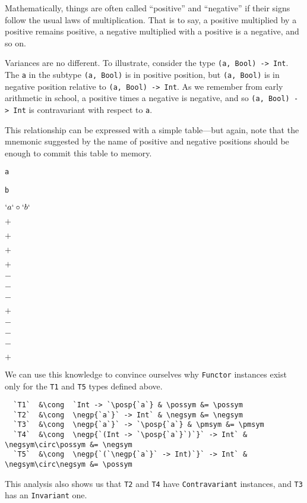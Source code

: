 \documentclass[
  11pt,
]{book}
\theoremstyle{nonumberplain}
\begin{document}
Mathematically, things are often called ``positive'' and ``negative'' if
their signs follow the usual laws of multiplication. That is to say, a
positive multiplied by a positive remains positive, a negative
multiplied with a positive is a negative, and so on.

Variances are no different. To illustrate, consider the type
\texttt{(a,\ Bool)\ -\textgreater{}\ Int}. The \texttt{a} in the subtype
\texttt{(a,\ Bool)} is in positive position, but \texttt{(a,\ Bool)} is
in negative position relative to
\texttt{(a,\ Bool)\ -\textgreater{}\ Int}. As we remember from early
arithmetic in school, a positive times a negative is negative, and so
\texttt{(a,\ Bool)\ -\textgreater{}\ Int} is contravariant with respect
to \texttt{a}.

This relationship can be expressed with a simple table---but again, note
that the mnemonic suggested by the name of positive and negative
positions should be enough to commit this table to memory.

\texttt{a}

\texttt{b}

\(`a` \circ `b`\)

\(+\)

\(+\)

\(+\)

\(+\)

\(-\)

\(-\)

\(-\)

\(+\)

\(-\)

\(-\)

\(-\)

\(+\)

We can use this knowledge to convince ourselves why \texttt{Functor}
instances exist only for the \texttt{T1} and \texttt{T5} types defined
above.

\begin{verbatim}
  `T1`  &\cong  `Int -> `\posp{`a`} & \possym &= \possym
  `T2`  &\cong  \negp{`a`}` -> Int` & \negsym &= \negsym
  `T3`  &\cong  \negp{`a`}` -> `\posp{`a`} & \pmsym &= \pmsym
  `T4`  &\cong  \negp{`(Int -> `\posp{`a`}`)`}` -> Int` & \negsym\circ\possym &= \negsym
  `T5`  &\cong  \negp{`(`\negp{`a`}` -> Int)`}` -> Int` & \negsym\circ\negsym &= \possym
\end{verbatim}

This analysis also shows us that \texttt{T2} and \texttt{T4} have
\texttt{Contravariant} instances, and \texttt{T3} has an
\texttt{Invariant} one.
\end{document}
